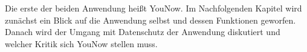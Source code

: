 Die erste der beiden Anwendung heißt YouNow. Im Nachfolgenden Kapitel wird zunächst ein Blick auf die Anwendung selbst und dessen Funktionen geworfen. Danach wird der Umgang mit Datenschutz der Anwendung diskutiert und welcher Kritik sich YouNow stellen muss.